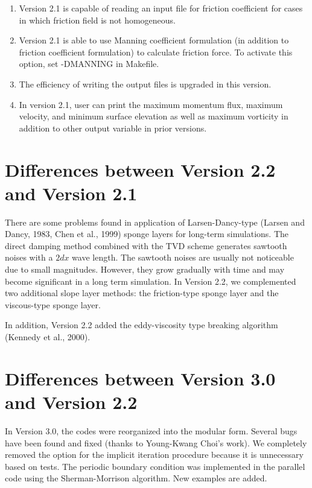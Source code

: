 \documentclass[11pt]{article}
\begin{document}
\begin{enumerate}
\item Version 2.1 is capable of reading an input file for friction coefficient for cases in which friction field is not homogeneous.

\item Version 2.1 is able to use Manning coefficient formulation (in addition to friction coefficient formulation) to calculate friction force. To activate this option, set -DMANNING in Makefile.

\item The efficiency of writing the output files is upgraded in this version.

\item In version 2.1, user can print the maximum momentum flux, maximum velocity, and minimum surface elevation as well as maximum vorticity in addition to other output variable in prior versions.


\end{enumerate}

\section*{Differences between Version 2.2 and Version 2.1}

There are some problems found in application of Larsen-Dancy-type (Larsen and Dancy, 1983, Chen et al., 1999) sponge layers for long-term simulations. The direct damping method combined with the TVD scheme  generates sawtooth noises with a $2 dx$ wave length. The sawtooth noises are usually not noticeable due to small magnitudes. However, they grow gradually with time and may become significant in a long term simulation. In Version 2.2, we complemented two additional slope layer methods: the friction-type sponge layer and the viscous-type sponge layer. 

In addition, Version 2.2 added the eddy-viscosity type breaking algorithm (Kennedy et al., 2000).

\section*{Differences between Version 3.0 and Version 2.2}

In Version 3.0, the codes were reorganized into the modular form. Several bugs have been found and fixed (thanks to Young-Kwang Choi's work).  We completely removed the option for the implicit iteration procedure because it is unnecessary based on tests. The periodic boundary condition was implemented in the parallel code using the Sherman-Morrison algorithm. New examples are added. 
\end{document}
